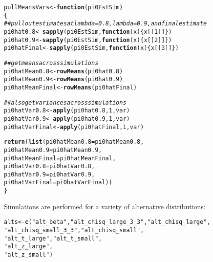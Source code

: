 \documentclass{article}\usepackage[]{graphicx}\usepackage[]{color}
\makeatletter
\newcommand{\hlnum}[1]{\textcolor[rgb]{0.686,0.059,0.569}{#1}}%
\newcommand{\hlstr}[1]{\textcolor[rgb]{0.192,0.494,0.8}{#1}}%
\newcommand{\hlcom}[1]{\textcolor[rgb]{0.678,0.584,0.686}{\textit{#1}}}%
\newcommand{\hlstd}[1]{\textcolor[rgb]{0.345,0.345,0.345}{#1}}%
\newcommand{\hlkwa}[1]{\textcolor[rgb]{0.161,0.373,0.58}{\textbf{#1}}}%
\newcommand{\hlkwb}[1]{\textcolor[rgb]{0.69,0.353,0.396}{#1}}%
\newcommand{\hlkwc}[1]{\textcolor[rgb]{0.333,0.667,0.333}{#1}}%
\newcommand{\hlkwd}[1]{\textcolor[rgb]{0.737,0.353,0.396}{\textbf{#1}}}%
\newenvironment{kframe}{%
 \def\at@end@of@kframe{}%
 \ifinner\ifhmode%
  \def\at@end@of@kframe{\end{minipage}}%
  \begin{minipage}{\columnwidth}%
 \fi\fi%
 \def\FrameCommand##1{\hskip\@totalleftmargin \hskip-\fboxsep
 \colorbox{shadecolor}{##1}\hskip-\fboxsep
     \hskip-\linewidth \hskip-\@totalleftmargin \hskip\columnwidth}%
 \MakeFramed {\advance\hsize-\width
   \@totalleftmargin\z@ \linewidth\hsize
   \@setminipage}}%
 {\par\unskip\endMakeFramed%
 \at@end@of@kframe}
\newenvironment{knitrout}{}{} %
\makeatother
\begin{document}
\begin{knitrout}
\color{fgcolor}\begin{kframe}
\begin{alltt}
\hlstd{pullMeansVars} \hlkwb{<-} \hlkwa{function}\hlstd{(}\hlkwc{pi0EstSim}\hlstd{)}
\hlstd{\{}
  \hlcom{##pull out estimates at lambda=0.8, lambda=0.9, and final estimate}
  \hlstd{pi0hat0.8} \hlkwb{<-} \hlkwd{sapply}\hlstd{(pi0EstSim,} \hlkwa{function}\hlstd{(}\hlkwc{x}\hlstd{)\{x[[}\hlnum{1}\hlstd{]]\})}
  \hlstd{pi0hat0.9} \hlkwb{<-} \hlkwd{sapply}\hlstd{(pi0EstSim,} \hlkwa{function}\hlstd{(}\hlkwc{x}\hlstd{)\{x[[}\hlnum{2}\hlstd{]]\})}
  \hlstd{pi0hatFinal} \hlkwb{<-} \hlkwd{sapply}\hlstd{(pi0EstSim,} \hlkwa{function}\hlstd{(}\hlkwc{x}\hlstd{)\{x[[}\hlnum{3}\hlstd{]]\})}

  \hlcom{##get means across simulations}
  \hlstd{pi0hatMean0.8} \hlkwb{<-} \hlkwd{rowMeans}\hlstd{(pi0hat0.8)}
  \hlstd{pi0hatMean0.9} \hlkwb{<-} \hlkwd{rowMeans}\hlstd{(pi0hat0.9)}
  \hlstd{pi0hatMeanFinal} \hlkwb{<-} \hlkwd{rowMeans}\hlstd{(pi0hatFinal)}

  \hlcom{##also get variances across simulations}
  \hlstd{pi0hatVar0.8} \hlkwb{<-} \hlkwd{apply}\hlstd{(pi0hat0.8,}\hlnum{1}\hlstd{,var)}
  \hlstd{pi0hatVar0.9} \hlkwb{<-} \hlkwd{apply}\hlstd{(pi0hat0.9,}\hlnum{1}\hlstd{,var)}
  \hlstd{pi0hatVarFinal} \hlkwb{<-} \hlkwd{apply}\hlstd{(pi0hatFinal,}\hlnum{1}\hlstd{,var)}

  \hlkwd{return}\hlstd{(}\hlkwd{list}\hlstd{(}\hlkwc{pi0hatMean0.8}\hlstd{=pi0hatMean0.8,}
              \hlkwc{pi0hatMean0.9}\hlstd{=pi0hatMean0.9,}
              \hlkwc{pi0hatMeanFinal}\hlstd{=pi0hatMeanFinal,}
              \hlkwc{pi0hatVar0.8}\hlstd{=pi0hatVar0.8,}
              \hlkwc{pi0hatVar0.9}\hlstd{=pi0hatVar0.9,}
              \hlkwc{pi0hatVarFinal}\hlstd{=pi0hatVarFinal))}
\hlstd{\}}
\end{alltt}
\end{kframe}
\end{knitrout}

Simulations are performed for a variety of alternative distributions:
\begin{knitrout}
\color{fgcolor}\begin{kframe}
\begin{alltt}
\hlstd{alts} \hlkwb{<-} \hlkwd{c}\hlstd{(}\hlstr{"alt_beta"}\hlstd{,}\hlstr{"alt_chisq_large_3_3"}\hlstd{,}\hlstr{"alt_chisq_large"}\hlstd{,}
          \hlstr{"alt_chisq_small_3_3"}\hlstd{,}\hlstr{"alt_chisq_small"}\hlstd{,}
          \hlstr{"alt_t_large"}\hlstd{,}\hlstr{"alt_t_small"}\hlstd{,}
          \hlstr{"alt_z_large"}\hlstd{,}
          \hlstr{"alt_z_small"}\hlstd{)}
\end{alltt}
\end{kframe}
\end{knitrout}
\end{document}
